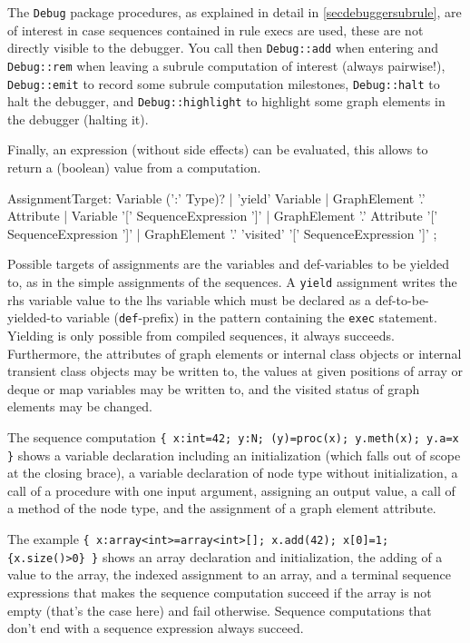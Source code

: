The \texttt{Debug} package procedures, as explained in detail in \ref{secdebuggersubrule}, are of interest in case sequences contained in rule execs are used, these are not directly visible to the debugger.
You call then \texttt{Debug::add} when entering and \texttt{Debug::rem} when leaving a subrule computation of interest (always pairwise!),
\texttt{Debug::emit} to record some subrule computation milestones, \texttt{Debug::halt} to halt the debugger, and \texttt{Debug::highlight} to highlight some graph elements in the debugger (halting it).

Finally, an expression (without side effects) can be evaluated, this allows to return a (boolean) value from a computation.

\begin{rail}
  AssignmentTarget: 
    Variable (':' Type)? |
    'yield' Variable |
    GraphElement '.' Attribute |
    Variable '[' SequenceExpression ']' |
    GraphElement '.' Attribute '[' SequenceExpression ']' |
    GraphElement '.' 'visited' '[' SequenceExpression ']'
;
\end{rail}

Possible targets of assignments are the variables and def-variables to be yielded to, as in the simple assignments of the sequences. 
A \texttt{yield} assignment writes the rhs variable value to the lhs variable which must be declared as a  def-to-be-yielded-to variable (\texttt{def}-prefix) in the pattern containing the \texttt{exec} statement.
Yielding is only possible from compiled sequences, it always succeeds.
Furthermore, the attributes of graph elements or internal class objects or internal transient class objects may be written to, the values at given positions of array or deque or map variables may be written to, and the visited status of graph elements may be changed.

\begin{example}
The sequence computation \verb#{ x:int=42; y:N; (y)=proc(x); y.meth(x); y.a=x }# shows a variable declaration including an initialization (which falls out of scope at the closing brace), a variable declaration of node type without initialization, a call of a procedure with one input argument, assigning an output value, a call of a method of the node type, and the assignment of a graph element attribute.

The example \verb#{ x:array<int>=array<int>[]; x.add(42); x[0]=1; {x.size()>0} }# shows an array declaration and initialization, the adding of a value to the array, the indexed assignment to an array, and a terminal sequence expressions that makes the sequence computation succeed if the array is not empty (that's the case here) and fail otherwise. Sequence computations that don't end with a sequence expression always succeed.
\end{example}

